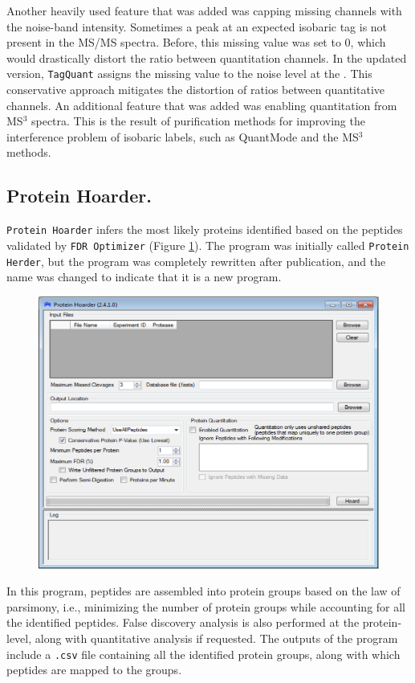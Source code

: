 Another heavily used feature that was added was capping missing channels with the noise-band intensity. Sometimes a peak at an expected isobaric tag \mz{} is not present in the MS/MS spectra. Before, this missing value was set to $0$, which would drastically distort the ratio between quantitation channels. In the updated version, \texttt{TagQuant} assigns the missing value to the noise level at the \mz{}. This conservative approach mitigates the distortion of ratios between quantitative channels. An additional feature that was added was enabling quantitation from MS$^3$ spectra. This is the result of purification methods for improving the interference problem of isobaric labels, such as QuantMode and the MS$^3$ methods.\cite{quantmode,ms3}

\subsection*{Protein Hoarder.}
\texttt{Protein Hoarder} infers the most likely proteins identified based on the peptides validated by \texttt{FDR Optimizer} (Figure \ref{fig:hoarder}). The program was initially called \texttt{Protein Herder}, but the program was completely rewritten after publication, and the name was changed to indicate that it is a new program.
\begin{figure}[p]
	\centering
	\includegraphics[width=\columnwidth]{csmsl/proteinhoarder.png}
	\label{fig:hoarder}
\end{figure}
In this program, peptides are assembled into protein groups based on the law of parsimony, i.e., minimizing the number of protein groups while accounting for all the identified peptides. False discovery analysis is also performed at the protein-level, along with quantitative analysis if requested. The outputs of the program include a \texttt{.csv} file containing all the identified protein groups, along with which peptides are mapped to the groups.

